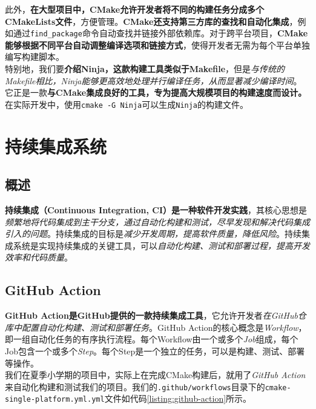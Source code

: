 此外，\textbf{在大型项目中，CMake允许开发者将不同的构建任务分成多个CMakeLists文件}，方便管理。\textbf{CMake还支持第三方库的查找和自动化集成}，例如通过\texttt{find\_package}命令自动查找并链接外部依赖库。对于跨平台项目，\textbf{CMake能够根据不同平台自动调整编译选项和链接方式}，使得开发者无需为每个平台单独编写构建脚本。\\

特别地，我们要\textbf{介绍Ninja，这款构建工具类似于Makefile}，但是\textit{与传统的Makefile相比，Ninja能够更高效地处理并行编译任务，从而显著减少编译时间}。它正是一款\textbf{与CMake集成良好的工具，专为提高大规模项目的构建速度而设计。}在实际开发中，使用\texttt{cmake -G Ninja}可以生成\texttt{Ninja}的构建文件。

\section{持续集成系统}

\subsection{概述}

\textbf{持续集成（Continuous Integration, CI）是一种软件开发实践}，其核心思想是\textit{频繁地将代码集成到主干分支，通过自动化构建和测试，尽早发现和解决代码集成引入的问题}。持续集成的目标是\textit{减少开发周期，提高软件质量，降低风险}。持续集成系统是实现持续集成的关键工具，可以\textit{自动化构建、测试和部署过程，提高开发效率和代码质量}。

\subsection{GitHub Action}

\textbf{GitHub Action是GitHub提供的一款持续集成工具}，它允许开发者\textit{在GitHub仓库中配置自动化构建、测试和部署任务}。GitHub Action的核心概念是\textit{Workflow}，即一组自动化任务的有序执行流程。每个Workflow由一个或多个\textit{Job}组成，每个Job包含一个或多个\textit{Step}。每个Step是一个独立的任务，可以是构建、测试、部署等操作。\\

我们在夏季小学期的项目中，实际上在完成CMake构建后，就用了\textit{GitHub Action}来自动化构建和测试我们的项目。我们的\texttt{.github/workflows}目录下的\texttt{cmake-single-platform.yml.yml}文件如代码\ref{listing:github-action}所示。

